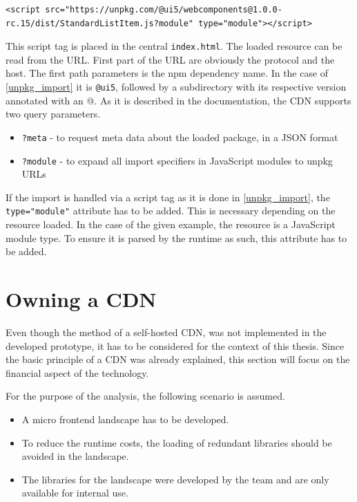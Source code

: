 \begin{lstlisting}[caption=Import of a dependecy using the unpkg API, label=list:unpkg_import]
	<script src="https://unpkg.com/@ui5/webcomponents@1.0.0-rc.15/dist/StandardListItem.js?module" type="module"></script>
\end{lstlisting}

This script tag is placed in the central \texttt{index.html}. The loaded resource can be read from the URL. First part of the URL are obviously the protocol and the host. The first path parameters is the npm dependency name. In the case of \ref{unpkg_import} it is \texttt{@ui5}, followed by a subdirectory with its respective version annotated with an @.
As it is described in the documentation, the CDN supports two query parameters.

\begin{itemize}[noitemsep]
	\item \texttt{?meta} - to request meta data about the loaded package, in a JSON format
	\item \texttt{?module} - to expand all import specifiers in JavaScript modules to unpkg URLs
\end{itemize}

If the import is handled via a script tag as it is done in \ref{unpkg_import}, the \texttt{type="module"} attribute has to be added. This is necessary depending on the resource loaded.
In the case of the given example, the resource is a JavaScript module type. To ensure it is parsed by the runtime as such, this attribute has to be added.\cite{js_module_type}

\section{Owning a CDN}

Even though the method of a self-hosted CDN, was not implemented in the developed prototype, it has to be considered for the context of this thesis. Since the basic principle of a CDN was already explained, this section will focus on the financial aspect of the technology.

For the purpose of the analysis, the following scenario is assumed.

\begin{itemize}[noitemsep]
	\item A micro frontend landscape has to be developed. 
	\item To reduce the runtime costs, the loading of redundant libraries should be avoided in the landscape.
	\item The libraries for the landscape were developed by the team and are only available for internal use.
\end{itemize} 

